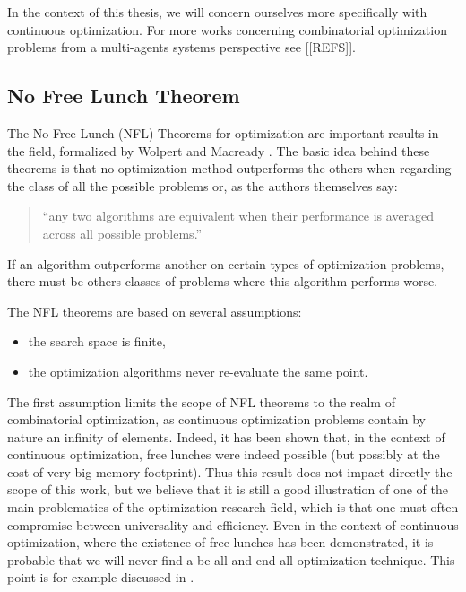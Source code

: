 In the context of this thesis, we will concern ourselves more specifically with continuous optimization. For more works concerning combinatorial optimization problems from a multi-agents systems perspective see [[REFS]].

\subsection{No Free Lunch Theorem}

The No Free Lunch (NFL) Theorems for optimization are important results in the field, formalized by Wolpert and Macready \cite{585893}. The basic idea behind these theorems is that no optimization method outperforms the others when regarding the class of all the possible problems or, as the authors themselves say:
\begin{quote}
\enquote{any two algorithms are equivalent when their performance is averaged across all possible problems.}
\end{quote}
If an algorithm outperforms another on certain types of optimization problems, there must be others classes of problems where this algorithm performs worse.

The NFL theorems are based on several assumptions:
\begin{itemize}

\item the search space is finite,

\item the optimization algorithms never re-evaluate the same point.

\end{itemize}

The first assumption limits the scope of NFL theorems to the realm of combinatorial optimization, as continuous optimization problems contain by nature an infinity of elements. Indeed, it has been shown that, in the context of continuous optimization, free lunches were indeed possible \cite{Auger-s00453-008-9244-5} (but possibly at the cost of very big memory footprint). Thus this result does not impact directly the scope of this work, but we believe that it is still a good illustration of one of the main problematics of the optimization research field, which is that one must often compromise between universality and efficiency. Even in the context of continuous optimization, where the existence of free lunches has been demonstrated, it is probable that we will never find a be-all and end-all optimization technique. This point is for example discussed in \cite{Doe05}.

